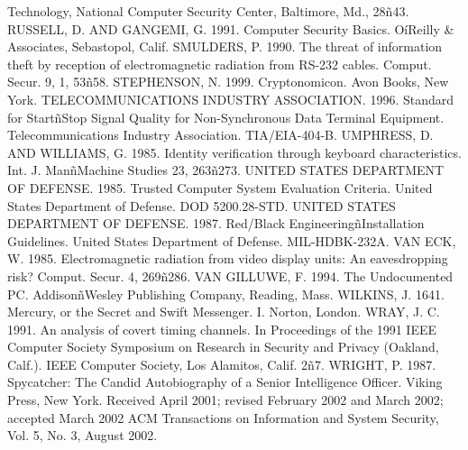 Technology, National Computer Security Center, Baltimore, Md., 28ñ43. 
RUSSELL, D. AND GANGEMI, G. 1991. Computer Security Basics. OíReilly & Associates, Sebastopol, 
Calif. 
SMULDERS, P. 1990. The threat of information theft by reception of electromagnetic radiation from 
RS-232 cables. Comput. Secur. 9, 1, 53ñ58. 
STEPHENSON, N. 1999. Cryptonomicon. Avon Books, New York. 
TELECOMMUNICATIONS INDUSTRY ASSOCIATION. 1996. Standard for StartñStop Signal Quality 
for Non-Synchronous Data Terminal Equipment. Telecommunications Industry Association. 
TIA/EIA-404-B. 
UMPHRESS, D. AND WILLIAMS, G. 1985. Identity verification through keyboard characteristics. Int. 
J. ManñMachine Studies 23, 263ñ273. 
UNITED STATES DEPARTMENT OF DEFENSE. 1985. Trusted Computer System Evaluation Criteria. 
United States Department of Defense. DOD 5200.28-STD. 
UNITED STATES DEPARTMENT OF DEFENSE. 1987. Red/Black EngineeringñInstallation Guidelines. 
United States Department of Defense. MIL-HDBK-232A. 
VAN ECK, W. 1985. Electromagnetic radiation from video display units: An eavesdropping risk? 
Comput. Secur. 4, 269ñ286. 
VAN GILLUWE, F. 1994. The Undocumented PC. AddisonñWesley Publishing Company, Reading, 
Mass. 
WILKINS, J. 1641. Mercury, or the Secret and Swift Messenger. I. Norton, London. 
WRAY, J. C. 1991. An analysis of covert timing channels. In Proceedings of the 1991 IEEE Computer 
Society Symposium on Research in Security and Privacy (Oakland, Calf.). IEEE Computer 
Society, Los Alamitos, Calif. 2ñ7. 
WRIGHT, P. 1987. Spycatcher: The Candid Autobiography of a Senior Intelligence Officer. Viking 
Press, New York. 
Received April 2001; revised February 2002 and March 2002; accepted March 2002 
ACM Transactions on Information and System Security, Vol. 5, No. 3, August 2002.

